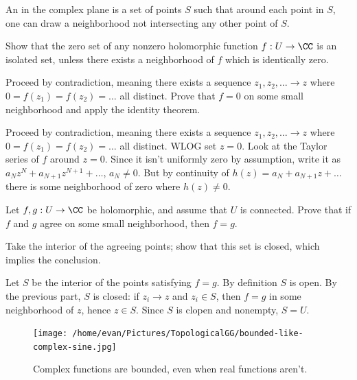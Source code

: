 \begin{sproblem}
	An  in the complex plane is a set of points $S$ such that
	around each point in $S$, one can draw a neighborhood not intersecting any other point of $S$.

	Show that the zero set of any nonzero holomorphic function $f : U \to \CC$
	is an isolated set, unless there exists a neighborhood of $f$ which is identically zero.
	\begin{hint}
		Proceed by contradiction, meaning there exists a sequence $z_1, z_2, \dots \to z$
		where $0 = f(z_1) = f(z_2) = \dots$ all distinct.
		Prove that $f = 0$ on some small neighborhood and apply the identity theorem.
	\end{hint}
	\begin{sol}
		Proceed by contradiction, meaning there exists a sequence $z_1, z_2, \dots \to z$
		where $0 = f(z_1) = f(z_2) = \dots$ all distinct.
		WLOG set $z=0$.
		Look at the Taylor series of $f$ around $z=0$.
		Since it isn't uniformly zero by assumption, write it as $a_Nz^N + a_{N+1}z^{N+1} + \dots$, $a_N \neq 0$.
		But by continuity of $h(z) = a_N + a_{N+1}z + \dots$ there is some
		neighborhood of zero where $h(z) \neq 0$.
	\end{sol}
\end{sproblem}

\begin{sproblem}
	\gim
	Let $f, g : U \to \CC$ be holomorphic, and assume that $U$ is connected.
	Prove that if $f$ and $g$ agree on some small neighborhood, then $f = g$.
	\begin{hint}
		Take the interior of the agreeing points;
		show that this set is closed, which implies the conclusion.
	\end{hint}
	\begin{sol}
		Let $S$ be the interior of the points satisfying $f=g$.
		By definition $S$ is open.
		By the previous part, $S$ is closed: if $z_i \to z$ and $z_i \in S$,
		then $f=g$ in some neighborhood of $z$, hence $z \in S$.
		Since $S$ is clopen and nonempty, $S = U$.
	\end{sol}
\end{sproblem}

\begin{figure}[ht]
	\centering
	\texttt{[image: /home/evan/Pictures/TopologicalGG/bounded-like-complex-sine.jpg]}
	\caption{Complex functions are bounded, even when real functions aren't.}
\end{figure}


